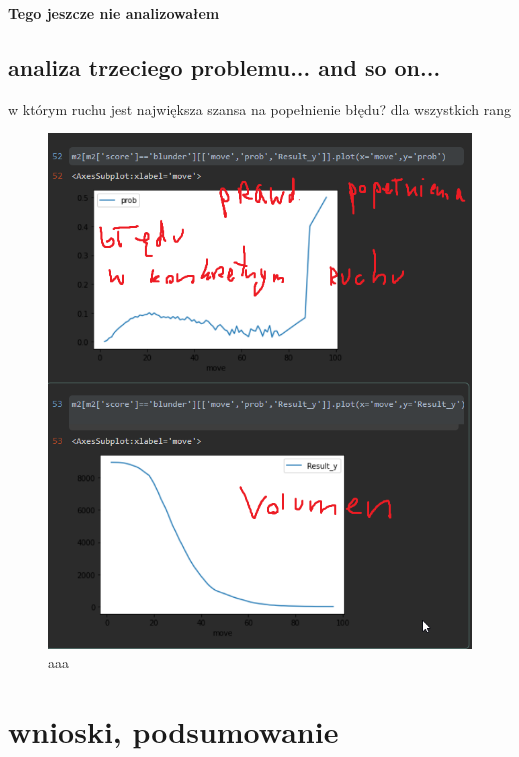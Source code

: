 \documentclass[inzynierska]{pwr_wmat_praca_dyplomowa}
\theoremstyle{plain}
\numberwithin{theorem}{chapter}
\theoremstyle{definition}
\numberwithin{theorem}{chapter}
\begin{document}
\textbf{Tego jeszcze nie analizowałem}




\section{analiza trzeciego problemu...  and so on...}
w którym ruchu jest największa szansa na popełnienie błędu?
dla wszystkich rang
\begin{figure}[H]
	\centering
	\includegraphics[width=\textwidth]{p_od_ruchu.png}
	\caption{aaa}\label{aaa}
\end{figure}
\chapter{wnioski, podsumowanie}
\end{document}
